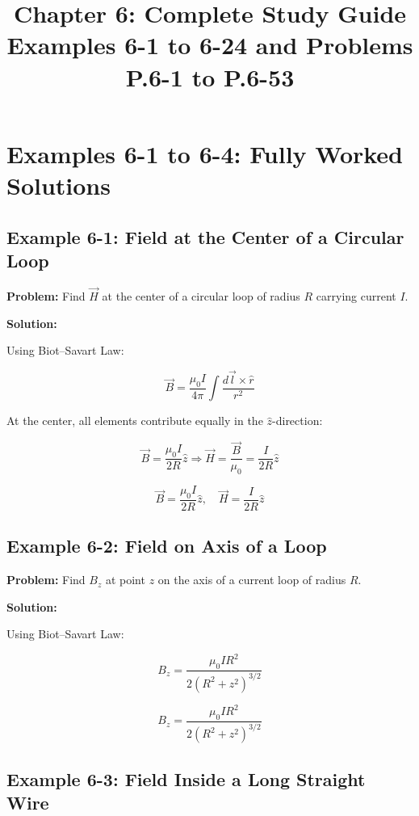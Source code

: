 \documentclass[12pt]{article}
\title{Chapter 6: Complete Study Guide \\ Examples 6-1 to 6-24 and Problems P.6-1 to P.6-53}
\author{}
\date{}
\begin{document}
\maketitle
\tableofcontents
\newpage

\section*{Examples 6-1 to 6-4: Fully Worked Solutions}

\subsection*{Example 6-1: Field at the Center of a Circular Loop}

\textbf{Problem:}  
Find \( \vec{H} \) at the center of a circular loop of radius \( R \) carrying current \( I \).

\textbf{Solution:}

Using Biot–Savart Law:

\[
\vec{B} = \frac{\mu_0 I}{4\pi} \int \frac{d\vec{l} \times \hat{r}}{r^2}
\]

At the center, all elements contribute equally in the \( \hat{z} \)-direction:

\[
\vec{B} = \frac{\mu_0 I}{2R} \hat{z}
\Rightarrow \vec{H} = \frac{\vec{B}}{\mu_0} = \frac{I}{2R} \hat{z}
\]

\begin{tcolorbox}
\[
\boxed{\vec{B} = \frac{\mu_0 I}{2R} \hat{z}}, \quad
\boxed{\vec{H} = \frac{I}{2R} \hat{z}}
\]
\end{tcolorbox}

\subsection*{Example 6-2: Field on Axis of a Loop}

\textbf{Problem:}  
Find \( B_z \) at point \( z \) on the axis of a current loop of radius \( R \).

\textbf{Solution:}

Using Biot–Savart Law:

\[
B_z = \frac{\mu_0 I R^2}{2 (R^2 + z^2)^{3/2}}
\]

\begin{tcolorbox}
\[
\boxed{B_z = \frac{\mu_0 I R^2}{2 (R^2 + z^2)^{3/2}}}
\]
\end{tcolorbox}

\subsection*{Example 6-3: Field Inside a Long Straight Wire}
\end{document}
